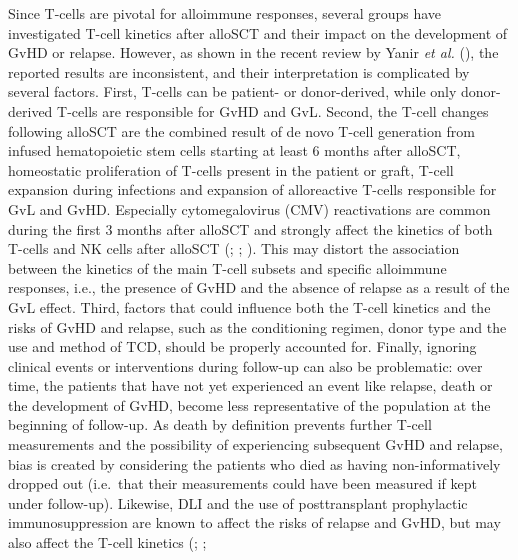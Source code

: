 \documentclass[
  letterpaper,
  paper=240mm:170mm,
  twoside=true,
  open=right,
  fontsize=10pt,
  pagesize=false,
  BCOR=15mm,
  DIV=14,
  headinclude=true,
  footinclude=false,
  headsepline=on]{scrbook}
\begin{document}
Since T-cells are pivotal for alloimmune responses, several groups have
investigated T-cell kinetics after alloSCT and their impact on the
development of GvHD or relapse. However, as shown in the recent review
by Yanir \emph{et al.}
(), the
reported results are inconsistent, and their interpretation is
complicated by several factors. First, T-cells can be patient- or
donor-derived, while only donor-derived T-cells are responsible for GvHD
and GvL. Second, the T-cell changes following alloSCT are the combined
result of de novo T-cell generation from infused hematopoietic stem
cells starting at least 6 months after alloSCT, homeostatic
proliferation of T-cells present in the patient or graft, T-cell
expansion during infections and expansion of alloreactive T-cells
responsible for GvL and GvHD. Especially cytomegalovirus (CMV)
reactivations are common during the first 3 months after alloSCT and
strongly affect the kinetics of both T-cells and NK cells after alloSCT
(;
; ). This may distort the association between the kinetics of
the main T-cell subsets and specific alloimmune responses, i.e., the
presence of GvHD and the absence of relapse as a result of the GvL
effect. Third, factors that could influence both the T-cell kinetics and
the risks of GvHD and relapse, such as the conditioning regimen, donor
type and the use and method of TCD, should be properly accounted for.
Finally, ignoring clinical events or interventions during follow-up can
also be problematic: over time, the patients that have not yet
experienced an event like relapse, death or the development of GvHD,
become less representative of the population at the beginning of
follow-up. As death by definition prevents further T-cell measurements
and the possibility of experiencing subsequent GvHD and relapse, bias is
created by considering the patients who died as having non-informatively
dropped out (i.e.~that their measurements could have been measured if
kept under follow-up). Likewise, DLI and the use of posttransplant
prophylactic immunosuppression are known to affect the risks of relapse
and GvHD, but may also affect the T-cell kinetics
(;
;
\end{document}
